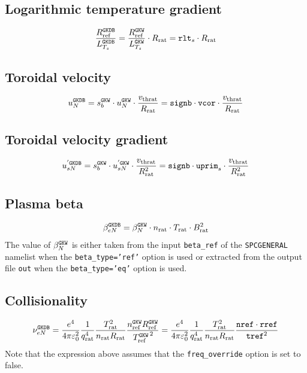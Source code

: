 \documentclass[a4paper]{report}
\begin{document}
\subsection{Logarithmic temperature gradient}
\begin{equation}
\frac{R_{\textrm{ref}}^{\texttt{GKDB}}}{L_{T_s}^{\texttt{GKDB}}} =  \frac{R_{\textrm{ref}}^{\texttt{GKW}}}{L_{T_s}^{\texttt{GKW}}} \cdot R_\textrm{rat} = \texttt{rlt}_s \cdot R_\textrm{rat}
\end{equation}

\subsection{Toroidal velocity}
\begin{equation}
u_N^{\texttt{GKDB}} = s_b^{\texttt{GKW}}\cdot u_N^{\texttt{GKW}} \cdot \frac{v_\textrm{thrat}}{R_\textrm{rat}}  = \texttt{signb} \cdot \texttt{vcor} \cdot \frac{v_\textrm{thrat}}{R_\textrm{rat}}
\end{equation}

\subsection{Toroidal velocity gradient}
\begin{equation}
u^{'\texttt{GKDB}}_{sN} = s_b^{\texttt{GKW}}\cdot  u^{'\texttt{GKW}}_{sN} \cdot \frac{v_\textrm{thrat}}{R_\textrm{rat}^2} = \texttt{signb} \cdot \texttt{uprim}_s \cdot \frac{v_\textrm{thrat}}{R_\textrm{rat}^2}
\end{equation}

\subsection{Plasma beta}
\begin{equation}
\beta_{eN}^{\texttt{GKDB}} = \beta_N^{\texttt{GKW}} \cdot n_\textrm{rat} \cdot T_\textrm{rat} \cdot B_\textrm{rat}^2 
\end{equation}
The value of $\beta_N^{\texttt{GKW}}$ is either taken from the input \texttt{beta\_ref} of the \texttt{SPCGENERAL} namelist when the  \texttt{beta\_type='ref'} option is used or extracted from the output file \texttt{out} when the  \texttt{beta\_type='eq'} option is used.
 
\subsection{Collisionality}
\begin{equation}
\nu_{eN}^{\texttt{GKDB}} = \frac{e^4}{4\pi\varepsilon_0^2}\frac{1}{q_\textrm{rat}^4}\frac{T_\textrm{rat}^2}{n_\textrm{rat}R_\textrm{rat}}\frac{n_{\textrm{ref}}^{\texttt{GKW}} R_{\textrm{ref}}^{\texttt{GKW}}}{\left.T_{\textrm{ref}}^{\texttt{GKW}}\right.^2} = \frac{e^4}{4\pi\varepsilon_0^2}\frac{1}{q_\textrm{rat}^4}\frac{T_\textrm{rat}^2}{n_\textrm{rat}R_\textrm{rat}} \frac{\texttt{nref}\cdot\texttt{rref}}{\texttt{tref}^2}
\end{equation}
Note that the expression above assumes that the \texttt{freq\_override} option is set to false. 
\end{document}
